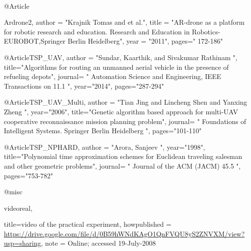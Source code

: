 \\
@Article{Ardrone2,
     author    = "Krajnik Tomas and et al.",
     title     = "AR-drone as a platform for robotic research and education. Research and Education in Robotics-EUROBOT,Springer Berlin Heidelberg",
     year      = "2011",
     pages=" 172-186"
     
}


@Article{TSP_UAV,
author = "Sundar, Kaarthik, and Sivakumar Rathinam ",
title="Algorithms for routing an unmanned aerial vehicle in the presence of refueling depots",
journal= " Automation Science and Engineering, IEEE Transactions on 11.1 ",
year="2014",
pages="287-294"
}

@Article{TSP_UAV_Multi,
author = "Tian Jing and Lincheng Shen and Yanxing Zheng ",
year="2006",
title="Genetic algorithm based approach for multi-UAV cooperative reconnaissance mission planning problem",
journal= " Foundations of Intelligent Systems. Springer Berlin Heidelberg ",
pages="101-110"
}

@Article{TSP_NPHARD,
author = "Arora, Sanjeev ",
year="1998",
title="Polynomial time approximation schemes for Euclidean traveling salesman and other geometric problems",
journal= " Journal of the ACM (JACM) 45.5 ",
pages="753-782"
}

@misc{videoreal,

title={video of the practical experiment},
howpublished = {\url{https://drive.google.com/file/d/0B59hWNdKAgO1QnFVQU8yS2ZNVXM/view?usp=sharing}},
  note = {Online; accessed 19-July-2008}
  }
